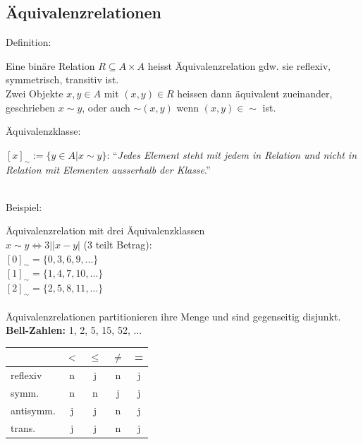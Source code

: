 \documentclass[8pt,landscape]{scrartcl}
\begin{document}
\begin{multicols}{3}
\subsection{\"Aquivalenzrelationen}
\begin{bf}Definition:\end{bf} Eine bin\"are Relation $R \subseteq A \times A $ heisst \"Aquivalenzrelation gdw. sie reflexiv, symmetrisch, transitiv ist.\\
Zwei Objekte $x, y \in A$ mit $(x, y) \in R$ heissen dann \"aquivalent zueinander, geschrieben $x \sim y$, oder auch $\sim (x, y)$ wenn $(x, y) \in \sim$ ist.\\
\begin{bf}\"Aquivalenzklasse:\end{bf} $\left[x\right]_{\sim} := \{ y \in A | x \sim y \}$: ``\textit{Jedes Element steht mit jedem in Relation und nicht in Relation mit Elementen ausserhalb der Klasse}.''\\\\ 
\begin{bf}Beispiel:\end{bf} \"Aquivalenzrelation mit drei \"Aquivalenzklassen\\
$x \sim y \iff 3| \left| x - y \right|$ (3 teilt Betrag):\\
$\left[0\right]_{\sim} = \{ 0, 3, 6, 9, ...\}$\\
$\left[1\right]_{\sim} = \{ 1, 4, 7, 10, ...\}$\\
$\left[2\right]_{\sim} = \{ 2, 5, 8, 11, ...\}$\\\\
\"Aquivalenzrelationen partitionieren ihre Menge und sind gegenseitig disjunkt.\\
\textbf{Bell-Zahlen:} 1, 2, 5, 15, 52, ...

\begin{tabular}{lcccc}
            & $<$ & $\leq$ & $\neq$ & = \\\hline
reflexiv    & n   & j      & n      & j \\
symm.       & n   & n      & j      & j \\
antisymm.   & j   & j      & n      & j \\
trans.      & j   & j      & n      & j \\\hline
\end{tabular}


\end{multicols}
\end{document}

